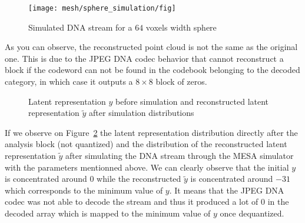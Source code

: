 \begin{figure}[ht]
    \centering
    \texttt{[image: mesh/sphere\_simulation/fig]}
    \caption{Simulated DNA stream for a $64$ voxels width sphere}
    \label{fig:simulated-sphere}
\end{figure}

As you can observe, the reconstructed point cloud is not the same as the original one. This is due to the JPEG DNA codec behavior that cannot reconstruct a block if the codeword can not be found in the codebook belonging to the decoded category, in which case it outputs a $8 \times 8$ block of zeros.

\begin{figure}[ht]
    \centering
    \resizebox{0.9\textwidth}{!}{}
    \caption{Latent representation $y$ before simulation and reconstructed latent representation $\tilde{y}$ after simulation distributions}
    \label{fig:simulated-latent-representation}
\end{figure}


If we observe on Figure~\ref{fig:simulated-latent-representation} the latent representation distribution directly after the analysis block (not quantized) and the distribution of the reconstructed latent representation $\tilde{y}$ after simulating the DNA stream through the MESA simulator with the parameters mentionned above. 
We can clearly observe that the initial $y$ is concentrated around $0$ while the reconstructed $\tilde{y}$ is concentrated around $-31$ which corresponds to the minimum value of $y$. It means that the JPEG DNA codec was not able to decode the stream and thus it produced a lot of $0$ in the decoded array which is mapped to the minimum value of $y$ once dequantized.
